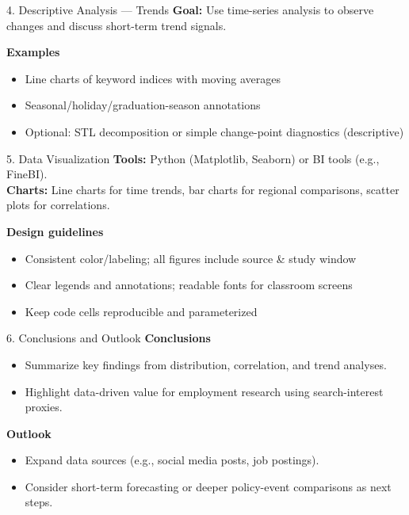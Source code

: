 \documentclass[aspectratio=169,11pt]{beamer}
\begin{document}
	\begin{frame}{4. Descriptive Analysis — Trends}
		\small
		\textbf{Goal:} Use time-series analysis to observe changes and discuss short-term trend signals.
		\medskip
		
		\textbf{Examples}
		\begin{itemize}
			\item Line charts of keyword indices with moving averages
			\item Seasonal/holiday/graduation-season annotations
			\item Optional: STL decomposition or simple change-point diagnostics (descriptive)
		\end{itemize}
	\end{frame}
	
	\begin{frame}{5. Data Visualization}
		\small
		\textbf{Tools:} Python (Matplotlib, Seaborn) or BI tools (e.g., FineBI). \\
		\textbf{Charts:} Line charts for time trends, bar charts for regional comparisons, scatter plots for correlations.
		\medskip
		
		\textbf{Design guidelines}
		\begin{itemize}
			\item Consistent color/labeling; all figures include source \& study window
			\item Clear legends and annotations; readable fonts for classroom screens
			\item Keep code cells reproducible and parameterized
		\end{itemize}
	\end{frame}
	
	\begin{frame}{6. Conclusions and Outlook}
		\small
		\textbf{Conclusions}
		\begin{itemize}
			\item Summarize key findings from distribution, correlation, and trend analyses.
			\item Highlight data-driven value for employment research using search-interest proxies.
		\end{itemize}
		\textbf{Outlook}
		\begin{itemize}
			\item Expand data sources (e.g., social media posts, job postings).
			\item Consider short-term forecasting or deeper policy-event comparisons as next steps.
		\end{itemize}
	\end{frame}
	
\end{document}
